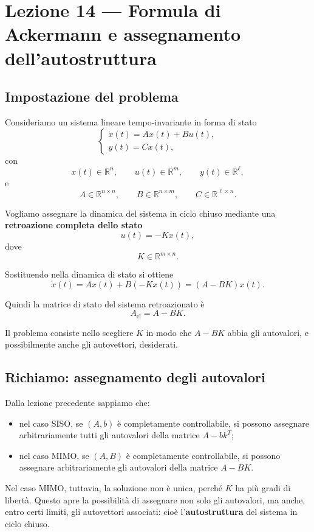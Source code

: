\chapter{Lezione 14 --- Formula di Ackermann e assegnamento dell'autostruttura}

\section{Impostazione del problema}

Consideriamo un sistema lineare tempo-invariante in forma di stato
\[
\begin{cases}
\dot x(t)=Ax(t)+Bu(t),\\[4pt]
y(t)=Cx(t),
\end{cases}
\]
con
\[
x(t)\in\mathbb{R}^n,\qquad
u(t)\in\mathbb{R}^m,\qquad
y(t)\in\mathbb{R}^\ell,
\]
e
\[
A\in\mathbb{R}^{n\times n},\qquad
B\in\mathbb{R}^{n\times m},\qquad
C\in\mathbb{R}^{\ell\times n}.
\]

Vogliamo assegnare la dinamica del sistema in ciclo chiuso mediante una
\textbf{retroazione completa dello stato}
\[
u(t)=-Kx(t),
\]
dove
\[
K\in\mathbb{R}^{m\times n}.
\]

Sostituendo nella dinamica di stato si ottiene
\[
\dot x(t)=Ax(t)+B(-Kx(t))=(A-BK)x(t).
\]

Quindi la matrice di stato del sistema retroazionato è
\[
A_{\text{cl}}=A-BK.
\]

Il problema consiste nello scegliere \(K\) in modo che \(A-BK\) abbia gli autovalori,
e possibilmente anche gli autovettori, desiderati.

\section{Richiamo: assegnamento degli autovalori}

Dalla lezione precedente sappiamo che:
\begin{itemize}
    \item nel caso SISO, se \((A,b)\) è completamente controllabile,
    si possono assegnare arbitrariamente tutti gli autovalori della matrice \(A-bk^T\);
    \item nel caso MIMO, se \((A,B)\) è completamente controllabile,
    si possono assegnare arbitrariamente gli autovalori della matrice \(A-BK\).
\end{itemize}

Nel caso MIMO, tuttavia, la soluzione non è unica, perché \(K\) ha più gradi di libertà.
Questo apre la possibilità di assegnare non solo gli autovalori, ma anche, entro certi limiti,
gli autovettori associati: cioè l'\textbf{autostruttura} del sistema in ciclo chiuso.

